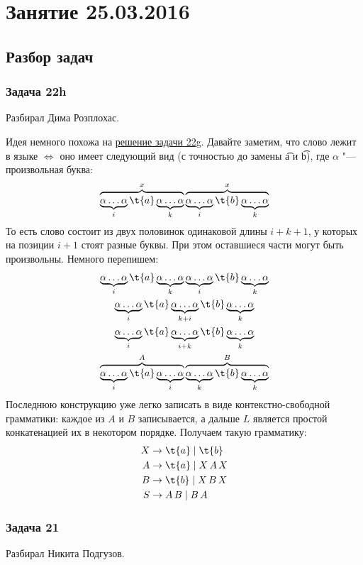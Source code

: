 \chapter{Занятие 25.03.2016}
\section{Разбор задач}

\subsection{Задача 22h}
	Разбирал Дима Розплохас.

	Идея немного похожа на \hyperref[prob22g]{решение задачи 22g}.
	Давайте заметим, что слово лежит в языке $\iff$ оно имеет следующий вид (с точностью до замены \t{a} и \t{b}),
	где $\alpha$ "--- произвольная буква:
	\[
		\overbrace{\somealpha{i}\t{a}\somealpha{k}}^x \overbrace{\somealpha{i}\t{b}\somealpha{k}}^x
	\]
	То есть слово состоит из двух половинок одинаковой длины $i+k+1$, у которых на позиции $i+1$ стоят разные буквы.
	При этом оставшиеся части могут быть произвольны.
	Немного перепишем:
	\begin{gather*}
		\somealpha{i}\t{a}\somealpha{k}\somealpha{i}\t{b}\somealpha{k} \\
		\somealpha{i}\t{a}\somealpha{k+i}\t{b}\somealpha{k} \\
		\somealpha{i}\t{a}\somealpha{i+k}\t{b}\somealpha{k} \\
		\overbrace{\somealpha{i}\t{a}\somealpha{i}}^{A}\overbrace{\somealpha{k}\t{b}\somealpha{k}}^{B}
	\end{gather*}
	Последнюю конструкцию уже легко записать в виде контекстно-свободной грамматики: каждое из $A$ и $B$
	записывается, а дальше $L$ является простой конкатенацией их в некотором порядке.
	Получаем такую грамматику:
	\begin{align*}
		X &\to \t{a} \mid \t{b} \\
		A &\to \t{a} \mid X\,A\,X \\
		B &\to \t{b} \mid X\,B\,X \\
		S &\to A\,B \mid B\,A
	\end{align*}

\subsection{Задача 21}
	Разбирал Никита Подгузов.
	\TODO

